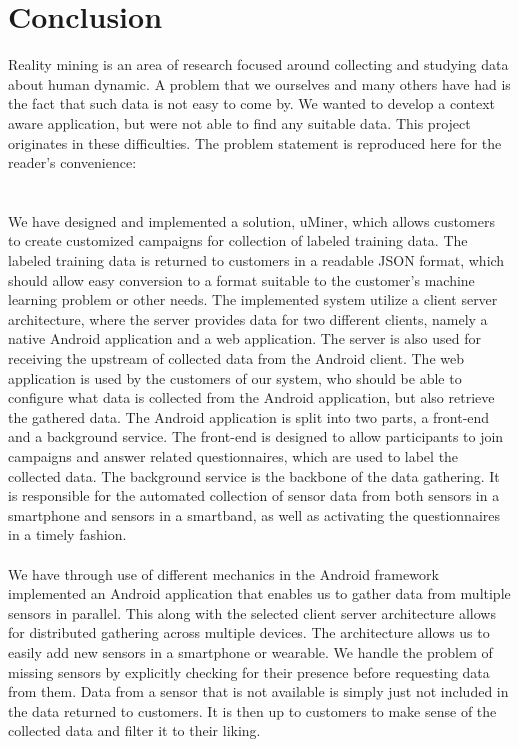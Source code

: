 
\chapter{Conclusion}
\label{cha:conclusion}
Reality mining is an area of research focused around collecting and studying data about human dynamic. A problem that we ourselves and many others have had is the fact that such data is not easy to come by. We wanted to develop a context aware application, but were not able to find any suitable data. This project originates in these difficulties. The problem statement is reproduced here for the reader's convenience:
\\

\\\\
We have designed and implemented a solution, uMiner, which allows customers to create customized campaigns for collection of labeled training data. The labeled training data is returned to customers in a readable JSON format, which should allow easy conversion to a format suitable to the customer's machine learning problem or other needs. The implemented system utilize a client server architecture, where the server provides data for two different clients, namely a native Android application and a web application. The server is also used for receiving the upstream of collected data from the Android client. The web application is used by the customers of our system, who should be able to configure what data is collected from the Android application, but also retrieve the gathered data. The Android application is split into two parts, a front-end and a background service. The front-end is designed to allow participants to join campaigns and answer related questionnaires, which are used to label the collected data. The background service is the backbone of the data gathering. It is responsible for the automated collection of sensor data from both sensors in a smartphone and sensors in a smartband, as well as activating the questionnaires in a timely fashion.  
\\\\
We have through use of different mechanics in the Android framework implemented an Android application that enables us to gather data from multiple sensors in parallel. This along with the selected client server architecture allows for distributed gathering across multiple devices. The architecture allows us to easily add new sensors in a smartphone or wearable. We handle the problem of missing sensors by explicitly checking for their presence before requesting data from them. Data from a sensor that is not available is simply just not included in the data returned to customers. It is then up to customers to make sense of the collected data and filter it to their liking.

